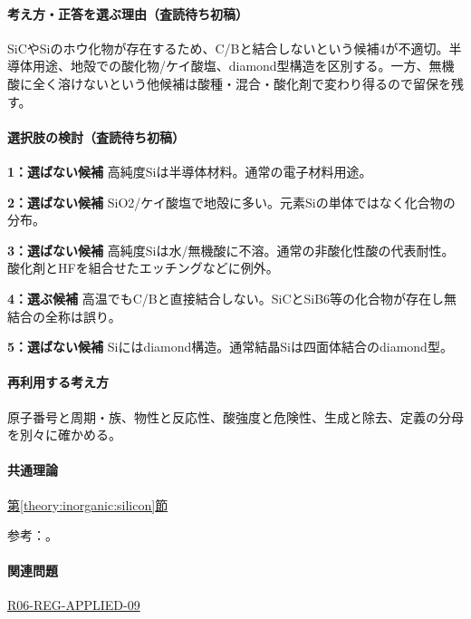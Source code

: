\paragraph{考え方・正答を選ぶ理由（査読待ち初稿）} SiCやSiのホウ化物が存在するため、C/Bと結合しないという候補4が不適切。半導体用途、地殻での酸化物/ケイ酸塩、diamond型構造を区別する。一方、無機酸に全く溶けないという他候補は酸種・混合・酸化剤で変わり得るので留保を残す。

\paragraph{選択肢の検討（査読待ち初稿）}\mbox{}\par

\noindent\textbf{1：選ばない候補} 高純度Siは半導体材料。通常の電子材料用途。\par

\noindent\textbf{2：選ばない候補} SiO2/ケイ酸塩で地殻に多い。元素Siの単体ではなく化合物の分布。\par

\noindent\textbf{3：選ばない候補} 高純度Siは水/無機酸に不溶。通常の非酸化性酸の代表耐性。酸化剤とHFを組合せたエッチングなどに例外。\par

\noindent\textbf{4：選ぶ候補} 高温でもC/Bと直接結合しない。SiCとSiB6等の化合物が存在し無結合の全称は誤り。\par

\noindent\textbf{5：選ばない候補} Siにはdiamond構造。通常結晶Siは四面体結合のdiamond型。\par

\paragraph{再利用する考え方} 原子番号と周期・族、物性と反応性、酸強度と危険性、生成と除去、定義の分母を別々に確かめる。

\paragraph{共通理論} \hyperref[theory:inorganic:silicon]{第\ref*{theory:inorganic:silicon}節}

\par 参考：\cite{inorganic_metalloid_ref,inorganic_sic,inorganic_sib6,inorganic_hf_etch}。

\paragraph{関連問題} \hyperref[q:r06-reg-applied-09]{R06-REG-APPLIED-09}

